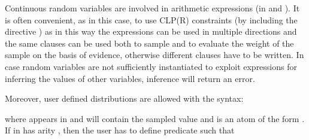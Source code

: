 \documentclass[letterpaper,10pt,english]{sphinxmanual}
\begin{document}
\begin{sphinxVerbatim}[commandchars=\\\{\}]
\end{sphinxVerbatim}

\sphinxAtStartPar
Continuous random variables are involved in arithmetic expressions (in  and ).
It is often convenient, as in this case, to use CLP(R) constraints (by including the directive ) as in this way the expressions can be used in multiple directions and the same clauses can be used both to sample and to evaluate the weight of the sample on the basis of evidence, otherwise different clauses have to be written.
In case random variables are not sufficiently instantiated to exploit expressions for inferring the values of other variables, inference will return an error.

\sphinxAtStartPar
Moreover, user defined distributions are allowed with the syntax:

\begin{sphinxVerbatim}[commandchars=\\\{\}]
\end{sphinxVerbatim}

\sphinxAtStartPar
where  appears in  and will contain the sampled value and  is an atom of the form .
If  in  has arity , then the user has to define predicate  such that

\begin{sphinxVerbatim}[commandchars=\\\{\}]
\end{sphinxVerbatim}
\end{document}
